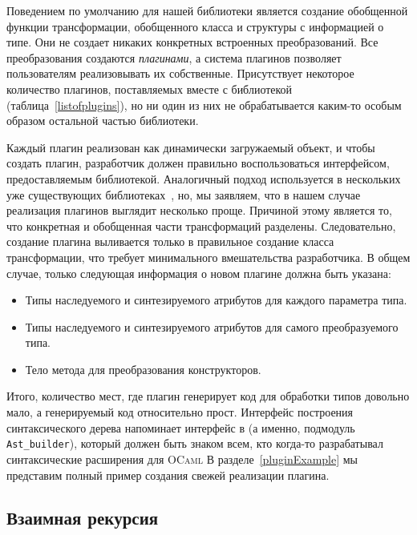 Поведением по умолчанию для нашей библиотеки является создание обобщенной функции трансформации, обобщенного класса и структуры с информацией о типе. Они не создает никаких конкретных встроенных преобразований. Все преобразования создаются \emph{плагинами}, а система плагинов позволяет пользователям реализовывать их собственные.
Присутствует некоторое количество плагинов, поставляемых вместе с библиотекой 
(таблица~\ref{listofplugins}), но ни один из них не обрабатывается каким-то особым образом остальной частью библиотеки.

Каждый плагин реализован как динамически загружаемый объект, и чтобы создать плагин, разработчик должен правильно воспользоваться интерфейсом, предоставляемым библиотекой.
Аналогичный подход используется в нескольких уже существующих 
библиотеках~\cite{PPXLib,Yallop}, но, мы заявляем, что в нашем случае реализация плагинов выглядит несколько проще. Причиной этому является то, что конкретная и обобщенная части трансформаций разделены. Следовательно, создание плагина выливается только в правильное создание класса трансформации, что требует минимального вмешательства разработчика.
В общем случае, только следующая информация о новом плагине должна быть указана:

\begin{itemize}
\item Типы наследуемого и синтезируемого атрибутов для каждого параметра типа.
\item Типы наследуемого и синтезируемого атрибутов для самого преобразуемого типа.
\item Тело метода для преобразования конструкторов.
\end{itemize}

Итого, количество мест, где плагин генерирует код для обработки типов довольно мало, а генерируемый код относительно прост. Интерфейс построения синтаксического дерева напоминает интерфейс в  (а именно, подмодуль \texttt{Ast\_builder}), который должен быть знаком всем, кто когда-то разрабатывал синтаксические расширения для \textsc{OCaml}
В разделе~\ref{pluginExample} мы представим полный пример создания свежей реализации плагина.

\subsection{Взаимная рекурсия}
\label{murec}

